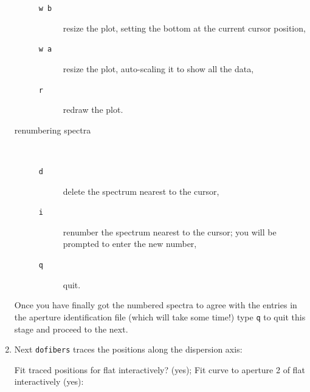 \documentclass[twoside,11pt]{starlink}
\begin{document}
\begin{enumerate}
\begin{description}
\begin{description}
      \item[\texttt{w~b}] resize the plot, setting the bottom at the
       current cursor position,

      \item[\texttt{w~a}] resize the plot, auto-scaling it to show all
       the data,

      \item[\texttt{r}] redraw the plot.

    \end{description}

    \item[renumbering spectra] ~

    \begin{description}

      \item[\texttt{d}] delete the spectrum nearest to the cursor,

      \item[\texttt{i}] renumber the spectrum nearest to the cursor;
       you will be prompted to enter the new number,

      \item[\texttt{q}] quit.

    \end{description}

  \end{description}

   Once you have finally got the numbered spectra to agree with the
   entries in the aperture identification file (which will take some
   time!) type \texttt{q} to quit this stage and proceed to the next.

  \item Next \texttt{dofibers} traces the positions along the dispersion
   axis:

\begin{terminalv}
Fit traced positions for flat interactively?  (yes);
Fit curve to aperture 2 of flat interactively  (yes):
\end{terminalv}


\end{enumerate}
\end{document}
